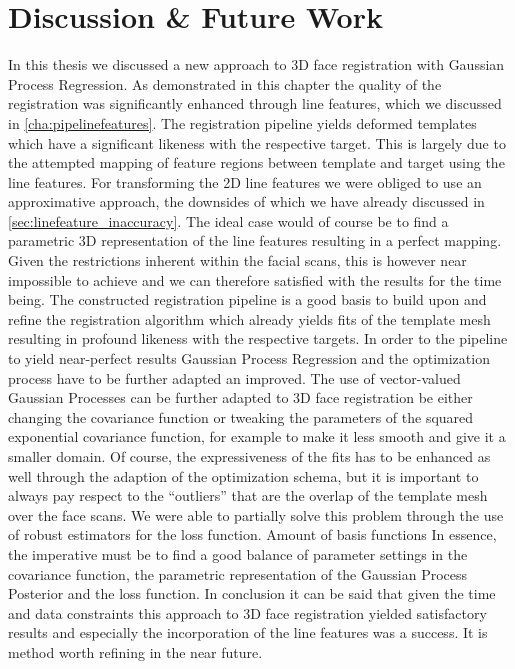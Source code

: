 \section{Discussion \& Future Work}
In this thesis we discussed a new approach to 3D face registration with Gaussian Process Regression. As demonstrated in this chapter the quality of the registration was significantly enhanced through line features, which we discussed in \ref{cha:pipelinefeatures}. The registration pipeline yields deformed templates which have a significant likeness with the respective target. This is largely due to the attempted mapping of feature regions between template and target using the line
features. For transforming the 2D line features we were obliged to use an approximative approach, the downsides of which we have already discussed in \ref{sec:linefeature_inaccuracy}. The ideal case would of course be to find a parametric 3D representation of the line features resulting in a perfect mapping. Given the restrictions inherent within the facial scans, this is however near impossible to achieve and we can therefore satisfied with the results for the time being.
The constructed registration pipeline is a good basis to build upon and refine the registration algorithm which already yields fits of the template mesh resulting in profound likeness with the respective targets.
In order to the pipeline to yield near-perfect results Gaussian Process Regression and the optimization process have to be further adapted an improved. The use of vector-valued Gaussian Processes can be further adapted to 3D face registration be either changing the covariance function or tweaking the parameters of the squared exponential covariance function, for example to make it less smooth and give it a smaller domain. Of course, the expressiveness of the fits has to be enhanced as
well through the adaption of the optimization schema, but it is important to always pay respect to the ``outliers'' that are the overlap of the template mesh over the face scans. We were able to partially solve this problem through the use of robust estimators for the loss function. 
Amount of basis functions
In essence, the imperative must be to find a good balance of parameter settings in the covariance function, the parametric representation of the Gaussian Process Posterior and the loss function.
In conclusion it can be said that given the time and data constraints this approach to 3D face registration yielded satisfactory results and especially the incorporation of the line features was a success. It is method worth refining in the near future.
